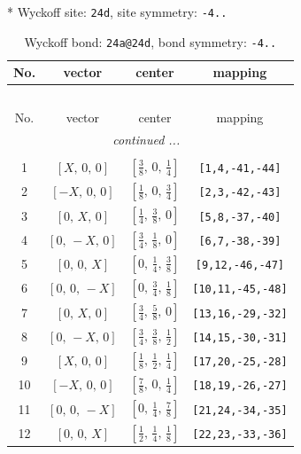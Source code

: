 \documentclass[fleqn,8pt]{jsarticle}
\begin{document}
* Wyckoff site: {\tt 24d}, site symmetry: {\tt -4..}
\renewcommand{\arraystretch}{1.2}
\begin{longtable}{cccc}
\caption{Wyckoff bond: {\tt 24a@24d}, bond symmetry: {\tt -4..}}
 \\
 \hline \hline
No. & vector & center & mapping \\ \hline \endfirsthead

\multicolumn{3}{l}{\tablename\ \thetable{}} \\
 \hline \hline
No. & vector & center & mapping \\ \hline \endhead

 \hline \hline
\multicolumn{3}{r}{\footnotesize\it continued ...} \\ \endfoot

 \hline \hline
\multicolumn{3}{r}{} \\ \endlastfoot

1 & $\left[ X,\, 0,\, 0 \right]$ & $\left[ \frac{3}{8},\, 0,\, \frac{1}{4} \right]$ & {\tt [1,4,-41,-44]} \\ \hline
2 & $\left[ - X,\, 0,\, 0 \right]$ & $\left[ \frac{1}{8},\, 0,\, \frac{3}{4} \right]$ & {\tt [2,3,-42,-43]} \\ \hline
3 & $\left[ 0,\, X,\, 0 \right]$ & $\left[ \frac{1}{4},\, \frac{3}{8},\, 0 \right]$ & {\tt [5,8,-37,-40]} \\ \hline
4 & $\left[ 0,\, - X,\, 0 \right]$ & $\left[ \frac{3}{4},\, \frac{1}{8},\, 0 \right]$ & {\tt [6,7,-38,-39]} \\ \hline
5 & $\left[ 0,\, 0,\, X \right]$ & $\left[ 0,\, \frac{1}{4},\, \frac{3}{8} \right]$ & {\tt [9,12,-46,-47]} \\ \hline
6 & $\left[ 0,\, 0,\, - X \right]$ & $\left[ 0,\, \frac{3}{4},\, \frac{1}{8} \right]$ & {\tt [10,11,-45,-48]} \\ \hline
7 & $\left[ 0,\, X,\, 0 \right]$ & $\left[ \frac{3}{4},\, \frac{5}{8},\, 0 \right]$ & {\tt [13,16,-29,-32]} \\ \hline
8 & $\left[ 0,\, - X,\, 0 \right]$ & $\left[ \frac{3}{4},\, \frac{3}{8},\, \frac{1}{2} \right]$ & {\tt [14,15,-30,-31]} \\ \hline
9 & $\left[ X,\, 0,\, 0 \right]$ & $\left[ \frac{1}{8},\, \frac{1}{2},\, \frac{1}{4} \right]$ & {\tt [17,20,-25,-28]} \\ \hline
10 & $\left[ - X,\, 0,\, 0 \right]$ & $\left[ \frac{7}{8},\, 0,\, \frac{1}{4} \right]$ & {\tt [18,19,-26,-27]} \\ \hline
11 & $\left[ 0,\, 0,\, - X \right]$ & $\left[ 0,\, \frac{1}{4},\, \frac{7}{8} \right]$ & {\tt [21,24,-34,-35]} \\ \hline
12 & $\left[ 0,\, 0,\, X \right]$ & $\left[ \frac{1}{2},\, \frac{1}{4},\, \frac{1}{8} \right]$ & {\tt [22,23,-33,-36]} \\
\end{longtable}
\end{document}
